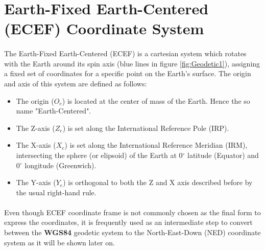 \section{Earth-Fixed Earth-Centered (ECEF) Coordinate System}\label{sec:ecef}

\paragraph{}The Earth-Fixed Earth-Centered (ECEF) is a cartesian system which rotates with the Earth around its spin axis (blue lines in figure \ref{fig:Geodetic1}), assigning a fixed set of coordinates for a specific point on the Earth's surface. The origin and axis of this system are defined as follows:
\begin{itemize}
\item{The origin (\textbf{$O_{e}$}) is located at the center of mass of the Earth. Hence the so name "Earth-Centered".}
\item{The Z-axis (\textbf{$Z_{e}$})} is set along the International Reference Pole (IRP).
\item{The X-axis (\textbf{$X_{e}$})} is set along the International Reference Meridian (IRM), intersecting the sphere (or elipsoid) of the Earth at 0$^{\circ}$ latitude (Equator) and 0$^{\circ}$ longitude (Greenwich).
\item{The Y-axis (\textbf{$Y_{e}$})} is orthogonal to both the Z and X axis described before by the usual right-hand rule.
\end{itemize}

\paragraph{}Even though ECEF coordinate frame is not commonly chosen as the final form to express the coordinates, it is frequently used as an intermediate step to convert between the \textbf{WGS84} geodetic system to the North-East-Down (NED) coordinate system as it will be shown later on.
